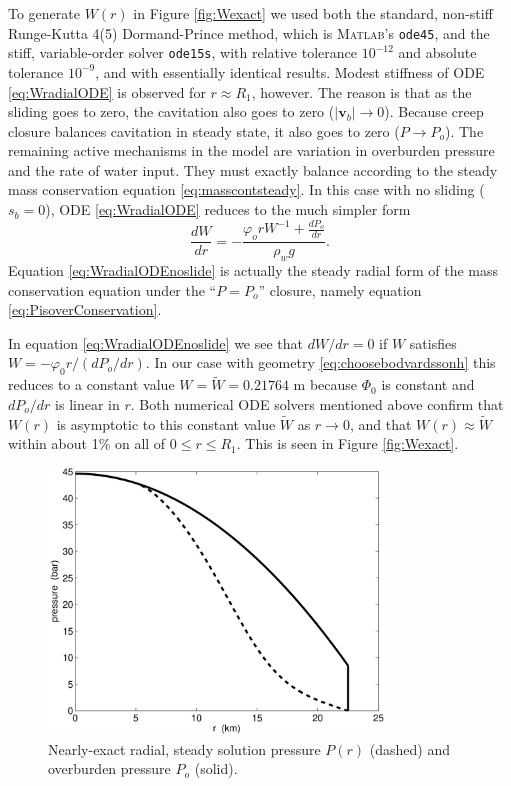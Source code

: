 \documentclass[11pt,final]{amsart}
\newcommand\bv{\mathbf{v}}
\newcommand\Matlab{\textsc{Matlab}\xspace}
\begin{document}
To generate $W(r)$ in Figure \ref{fig:Wexact} we used both the standard, non-stiff Runge-Kutta 4(5) Dormand-Prince method, which is \Matlab's \texttt{ode45}, and the stiff, variable-order solver \texttt{ode15s}, with relative tolerance $10^{-12}$ and absolute tolerance $10^{-9}$, and with essentially identical results.
Modest stiffness \citep{AscherPetzold} of ODE \eqref{eq:WradialODE} is observed for $r\approx R_1$, however.  The reason is that as the sliding goes to zero, the cavitation also goes to zero ($|\bv_b|\to 0$).  Because creep closure balances cavitation in steady state, it also goes to zero ($P\to P_o$).  The remaining active mechanisms in the model are variation in overburden pressure and the rate of water input.  They must exactly balance according to the steady mass conservation equation \eqref{eq:masscontsteady}.  In this case with no sliding ($s_b=0$), ODE \eqref{eq:WradialODE} reduces to the much simpler form
\begin{equation}
\frac{dW}{dr} = - \frac{\varphi_o r W^{-1} + \frac{dP_o}{dr}}{\rho_w g}. \label{eq:WradialODEnoslide}
\end{equation}
Equation \eqref{eq:WradialODEnoslide} is actually the steady radial form of the mass conservation equation under the ``$P=P_o$'' closure, namely equation \eqref{eq:PisoverConservation}.

In equation \eqref{eq:WradialODEnoslide} we see that $dW/dr=0$ if $W$ satisfies $W = - \varphi_0 r / (dP_o/dr)$.  In our case with geometry \eqref{eq:choosebodvardssonh} this reduces to a constant value $W=\tilde W= 0.21764$ m because $\Phi_0$ is constant and $dP_o/dr$ is linear in $r$.  Both numerical ODE solvers mentioned above confirm that $W(r)$ is asymptotic to this constant value $\tilde W$ as $r\to 0$, and that $W(r)\approx \tilde W$ within about 1\% on all of $0\le r \le R_1$.  This is seen in Figure \ref{fig:Wexact}.

\begin{figure}[ht]
\includegraphics[width=3.5in,keepaspectratio=true]{exact-P-plot}
\caption{Nearly-exact radial, steady solution pressure $P(r)$ (dashed) and overburden pressure $P_o$ (solid).}
\label{fig:Pexact}
\end{figure}
\end{document}
